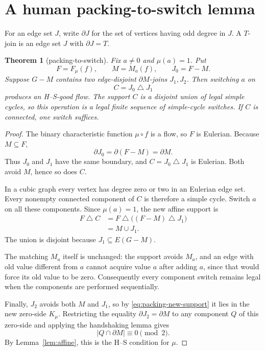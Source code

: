 \documentclass[11pt]{article}
\newtheorem{theorem}{Theorem}[section]
\theoremstyle{definition}
\theoremstyle{remark}
\newcommand{\bd}{\partial}
\newcommand{\symdiff}{\mathbin{\triangle}}
\numberwithin{equation}{section}
\begin{document}
\section{A human packing-to-switch lemma}

For an edge set \(J\), write \(\bd J\) for the set of vertices having odd
degree in \(J\).  A \(T\)-join is an edge set \(J\) with \(\bd J=T\).

\begin{theorem}[packing-to-switch]\label{thm:packing}
Fix \(a\ne0\) and \(\mu(a)=1\).  Put
\[
 F=F_\mu(f),\qquad M=M_a(f),\qquad J_0=F-M.
\]
Suppose \(G-M\) contains two edge-disjoint \(\bd M\)-joins
\(J_1,J_2\).  Then switching \(a\) on
\begin{equation}
                       C=J_0\symdiff J_1
\end{equation}
produces an H--S-good flow.  The support \(C\) is a disjoint union of
legal simple cycles, so this operation is a legal finite sequence of
simple-cycle switches.  If \(C\) is connected, one switch suffices.
\end{theorem}

\begin{proof}
The binary characteristic function \(\mu\circ f\) is a flow, so \(F\)
is Eulerian.  Because \(M\subseteq F\),
\[
                         \bd J_0=\bd(F-M)=\bd M.
\]
Thus \(J_0\) and \(J_1\) have the same boundary, and
\(C=J_0\symdiff J_1\) is Eulerian.  Both avoid \(M\), hence so does
\(C\).

In a cubic graph every vertex has degree zero or two in an Eulerian edge
set.  Every nonempty connected component of \(C\) is therefore a simple
cycle.  Switch \(a\) on all these components.  Since \(\mu(a)=1\), the
new affine support is
\begin{equation}
\begin{split}
 F\symdiff C
   &=F\symdiff\bigl((F-M)\symdiff J_1\bigr)\\
   &=M\cup J_1.
\end{split}
\label{eq:packing-new-support}
\end{equation}
The union is disjoint because \(J_1\subseteq E(G-M)\).

The matching \(M_a\) itself is unchanged: the support avoids \(M_a\), and
an edge with old value different from \(a\) cannot acquire value \(a\)
after adding \(a\), since that would force its old value to be zero.
Consequently every component switch remains legal when the components
are performed sequentially.

Finally, \(J_2\) avoids both \(M\) and \(J_1\), so by
\eqref{eq:packing-new-support} it lies in
the new zero-side \(K_\mu\).  Restricting the equality
\(\bd J_2=\bd M\) to any component \(Q\) of this zero-side and applying
the handshaking lemma gives
\[
                       |Q\cap\bd M|\equiv0\pmod2.
\]
By Lemma~\ref{lem:affine}, this is the H--S condition for \(\mu\).
\end{proof}
\end{document}
